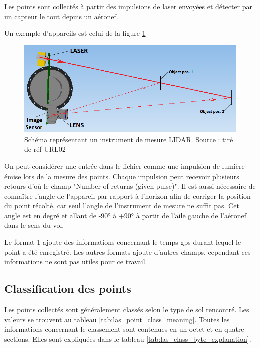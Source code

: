 Les points sont collectés à partir des impulsions de laser envoyées et détecter par un capteur le tout depuis un aéronef.

Un exemple d'appareils est celui de la figure \ref{fig:lidar_scheme}

\begin{figure}[htbp!]
    \centering
    \includegraphics[width=0.8\linewidth]{figures/lidar_schema.png}
    \caption{Schéma représentant un instrument de mesure LIDAR. Source : tiré de réf URL02}
    \label{fig:lidar_scheme}
\end{figure}

On peut considérer une entrée dans le fichier comme une impulsion de lumière émise lors de la mesure des points.
Chaque impulsion peut recevoir plusieurs retours d'où le champ "Number of returns (given pulse)".
Il est aussi nécessaire de connaître l'angle de l'appareil par rapport à l'horizon afin de corriger la position du point récolté, car seul l'angle de l'instrument de mesure ne suffit pas.
Cet angle est en degré et allant de -90° à +90° à partir de l'aile gauche de l'aéronef dans le sens du vol.


Le format 1 ajoute des informations concernant le temps \gls{gps} durant lequel le point a été enregistré.
Les autres formats ajoute d'autres champs, cependant ces informations ne sont pas utiles pour ce travail.

\subsection{Classification des points}

Les points collectés sont généralement classés selon le type de sol rencontré. Les valeurs se trouvent au tableau \ref{tab:las_point_class_meaning}.
Toutes les informations concernant le classement sont contenues en un octet et  en quatre sections. Elles sont expliquées dans le tableau \ref{tab:las_class_byte_explanation}.

